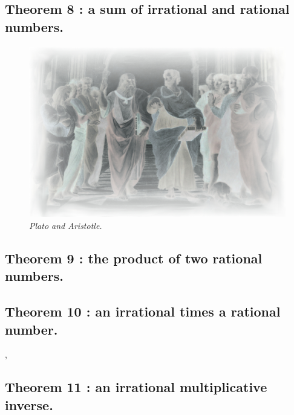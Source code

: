 \documentclass[preview]{standalone}
\begin{document}
\subsection[A sum of irrational and rational numbers.]{\color{section} Theorem 8 \color{black} : a sum of irrational and rational numbers.}

\begin{figure}[h!]
    \centering
    \includegraphics[width=12.5cm]{../resources/jpg/1.6.introduction.to.proofs/plato-republic.jpg}
    \caption*{\emph{Plato and Aristotle.}}
\end{figure}


\subsection[The product of two rational numbers.]{\color{section} Theorem 9 \color{black} : the product of two rational numbers.}

\pagebreak


\subsection[An irrational times a rational number.]{\color{section} Theorem 10 \color{black} : an irrational times a rational number.}

\sep


\subsection[An irrational multiplicative inverse.]{\color{section} Theorem 11 \color{black} : an irrational multiplicative inverse.}

\pagebreak
\end{document}
